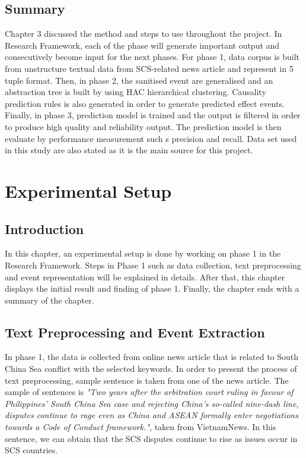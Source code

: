 \documentclass[twoside]{utmthesis}
\begin{document}
\section{Summary}
Chapter 3 discussed the method and steps to use throughout the project. In Research Framework, each of the phase will generate important output and consecutively become input for the next phases. For phase 1, data corpus is built from unstructure textual data from SCS-related news article and represent in 5 tuple format. Then, in phase 2, the sanitised event are generalised and an abstraction tree is built by using HAC hierarchical clustering. Causality prediction rules is also generated in order to generate predicted effect events. Finally, in phase 3, prediction model is trained and the output is filtered in order to produce high quality and reliability output. The prediction model is then evaluate by performance measurement such s precision and recall. Data set used in this study are also stated as it is the main source for this project.  


\chapter{Experimental Setup}
\section{Introduction}
In this chapter, an experimental setup is done by working on phase 1 in the Research Framework. Steps in Phase 1 such as data collection, text preprocessing and event representation will be explained in details. After that, this chapter displays the initial result and finding of phase 1. Finally, the chapter ends with a summary of the chapter.

\section{Text Preprocessing and Event Extraction}
In phase 1, the data is collected from online news article that is related to South China Sea conflict with the selected keywords. In order to present the process of text preprocessing, sample sentence is taken from one of the news article. The sample of sentences is \textit{"Two years after the arbitration court ruling in favour of Philippines’ South China Sea case and rejecting China’s so-called nine-dash line, disputes continue to rage even as China and ASEAN formally enter negotiations towards a Code of Conduct framework."}, taken from VietnamNews. In this sentence, we can obtain that the SCS disputes continue to rise as issues occur in SCS countries.
\end{document}
